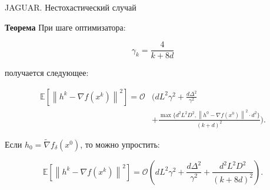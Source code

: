 \documentclass{beamer}
\newcommand{\expect}[1]{\mathbb{E}\left[ #1 \right]}
\newcommand{\norms}[1]{\left\| #1 \right\|}
\begin{document}
\begin{frame}{JAGUAR. Нестохастический случай}

    \textbf{Теорема} При шаге оптимизатора:
            
    $$\gamma_k = \frac{4}{k + 8d}$$
            
    получается следующее:

    \small{
        \begin{equation*}
            \begin{split}
                \expect{\norms{h^{k} - \nabla f(x^{k})}^2} = \mathcal{O}
                &\Bigg(
                d L^2 \gamma^2 + \frac{d \Delta^2}{\gamma^2}
                \\&+
                \frac{\max \{d^2 L^2 D^2, \norms{h^0 - \nabla f(x^0)}^2 \cdot d^2\}}{(k + d)^2}
                \Bigg).
            \end{split}
        \end{equation*}
    }

    Если $h_0 = \widetilde{\nabla} f_\delta(x^0)$, то можно упростить:
    
    \begin{equation*}
        \expect{\norms{h^{k} - \nabla f(x^{k})}^2} = 
        \mathcal{O} \left( d L^2 \gamma^2 
        + \frac{d \Delta^2}{\gamma^2}
        + \frac{d^2 L^2 D^2}{(k + 8d)^2} \right).
    \end{equation*}
        
\end{frame}

\end{document}
